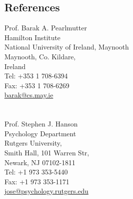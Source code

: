 \documentclass[12pt,overlapped,line]{res}
\begin{document}
\begin{resume}
 \section{References}
  \begin{multicols}{2}
 {\small
    Prof. Barak A. Pearlmutter \\
    Hamilton Institute \\
    National University of Ireland, Maynooth \\
    Maynooth, Co. Kildare, \\
    Ireland \\
    Tel: +353 1 708-6394\\
    Fax: +353 1 708-6269\\
    \url{barak@cs.may.ie} \\
\\
\\
    Prof. Stephen J. Hanson \\
    Psychology Department \\
    Rutgers University, \\
    Smith Hall, 101 Warren Str, \\
    Newark, NJ 07102-1811 \\
    Tel: +1 973 353-5440 \\
    Fax: +1 973 353-1171 \\
    \url{jose@psychology.rutgers.edu} \\
 }
 \end{multicols}


\end{resume}
\end{document}
